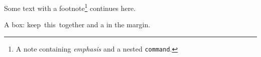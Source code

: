 Some text with a footnote\footnote{A note containing \emph{emphasis} and a
nested \texttt{command}.} continues here.

A box: \mbox{keep this together} and a  in the margin.
